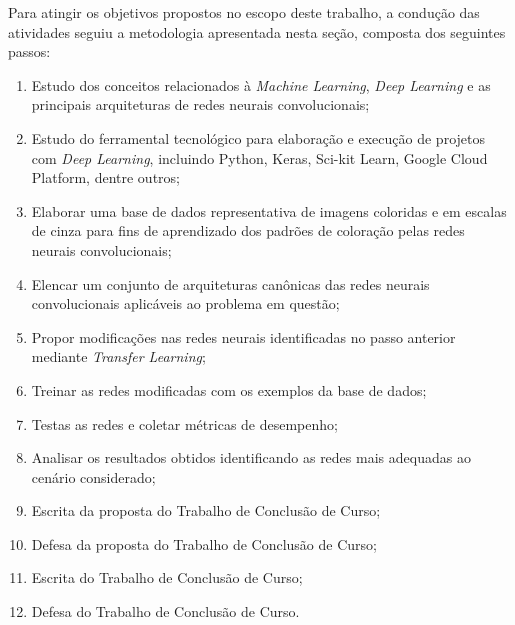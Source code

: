 Para atingir os objetivos propostos no escopo deste trabalho, a condução das atividades seguiu a metodologia apresentada nesta seção, composta dos seguintes passos:

\begin{enumerate}
	\item Estudo dos conceitos relacionados à \textit{Machine Learning}, \textit{Deep Learning} e as principais arquiteturas de redes neurais convolucionais;
	\item Estudo do ferramental tecnológico para elaboração e execução de projetos com \textit{Deep Learning}, incluindo Python, Keras, Sci-kit Learn, Google Cloud Platform, dentre outros;
	\item Elaborar uma base de dados representativa de imagens coloridas e em escalas de cinza para fins de aprendizado dos padrões de coloração pelas redes neurais convolucionais;
	\item Elencar um conjunto de arquiteturas canônicas das redes neurais convolucionais aplicáveis ao problema em questão;
	\item Propor modificações nas redes neurais identificadas no passo anterior mediante \textit{Transfer Learning};
	\item Treinar as redes modificadas com os exemplos da base de dados;
	\item Testas as redes e coletar métricas de desempenho;
	\item Analisar os resultados obtidos identificando as redes mais adequadas ao cenário considerado;
	\item Escrita da proposta do Trabalho de Conclusão de Curso;
	\item Defesa da proposta do Trabalho de Conclusão de Curso;
	\item Escrita do Trabalho de Conclusão de Curso;
	\item Defesa do Trabalho de Conclusão de Curso.
\end{enumerate}